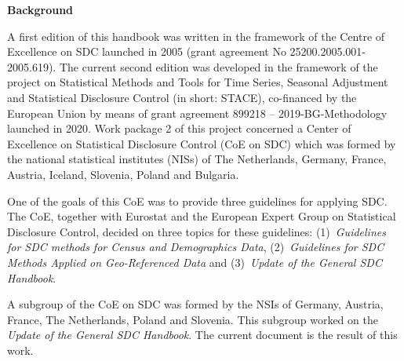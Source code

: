 	
	\vfill %
	
	\newpage 

	

		
	\noindent \textbf{\large Background}\bigskip

	\justifying

	\noindent A first edition of this handbook was written in the framework of the Centre of Excellence on SDC launched in 2005 (grant agreement No 25200.2005.001-2005.619).
 	 The current second edition was developed in the framework of the project on Statistical Methods and Tools
	 for Time Series, Seasonal Adjustment and Statistical Disclosure Control (in short: STACE), 
	 co-financed by the European Union by means of grant agreement 899218 -- 2019-BG-Methodology launched in 2020. 
	 Work package 2 of this project concerned a Center of Excellence on Statistical Disclosure Control (CoE on SDC)
	  which was formed by the national statistical institutes (NISs) of The Netherlands, Germany, France, Austria, 
	  Iceland, Slovenia, Poland and Bulgaria.

	One of the goals of this CoE was to provide three guidelines for applying SDC. 
	The CoE, together with Eurostat and the European Expert Group on Statistical Disclosure Control, 
	decided on three topics for these guidelines: (1)~\textit{Guidelines for SDC methods for Census and Demographics Data},
	 (2)~\textit{Guidelines for SDC Methods Applied on Geo-Referenced Data} and (3)~\textit{Update of the General SDC Handbook}.

	A subgroup of the CoE on SDC was formed by the NSIs of Germany, Austria, France, The Netherlands, Poland and Slovenia. 
	This subgroup worked on the \textit{Update of the General SDC Handbook}. The current document is the result of this work.

	\vfill
